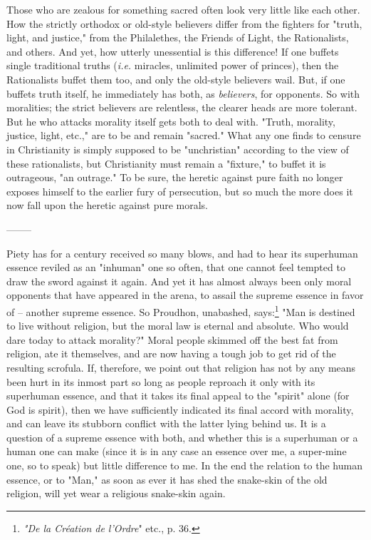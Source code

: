 Those who are zealous for something sacred often look very little like each 
other. How the strictly orthodox or old-style believers differ from the 
fighters for "{}truth, light, and justice,"{} from the Philalethes, the 
Friends of Light, the Rationalists, and others. And yet, how utterly 
unessential is this difference! If one buffets single traditional truths 
(\textit{i.e.} miracles, unlimited power of princes), then the Rationalists 
buffet them too, and only the old-style believers wail. But, if one buffets 
truth itself, he immediately has both, as \textit{believers}, for opponents. 
So with moralities; the strict believers are relentless, the clearer heads are 
more tolerant. But he who attacks morality itself gets both to deal with. 
"{}Truth, morality, justice, light, etc.,"{} are to be and remain 
"{}sacred."{} What any one finds to censure in Christianity is simply supposed 
to be "{}unchristian"{} according to the view of these rationalists, but 
Christianity must remain a "{}fixture,"{} to buffet it is outrageous, "{}an 
outrage."{} To be sure, the heretic against pure faith no longer exposes 
himself to the earlier fury of persecution, but so much the more does it now 
fall upon the heretic against pure morals.

\begin{center}
--------\end{center}


Piety has for a century received so many blows, and had to hear its superhuman 
essence reviled as an "{}inhuman"{} one so often, that one cannot feel tempted 
to draw the sword against it again. And yet it has almost always been only 
moral opponents that have appeared in the arena, to assail the supreme essence 
in favor of -- another supreme essence. So Proudhon, unabashed, 
says:\footnote{\textit{"{}De la Cr\'eation de l'Ordre}"{} etc., p. 36.} "{}Man 
is destined to live without religion, but the moral law is eternal and 
absolute. Who would dare today to attack morality?"{} Moral people skimmed off 
the best fat from religion, ate it themselves, and are now having a tough job 
to get rid of the resulting scrofula. If, therefore, we point out that 
religion has not by any means been hurt in its inmost part so long as people 
reproach it only with its superhuman essence, and that it takes its final 
appeal to the "{}spirit"{} alone (for God is spirit), then we have 
sufficiently indicated its final accord with morality, and can leave its 
stubborn conflict with the latter lying behind us. It is a question of a 
supreme essence with both, and whether this is a superhuman or a human one can 
make (since it is in any case an essence over me, a super-mine one, so to 
speak) but little difference to me. In the end the relation to the human 
essence, or to "{}Man,"{} as soon as ever it has shed the snake-skin of the 
old religion, will yet wear a religious snake-skin again.

